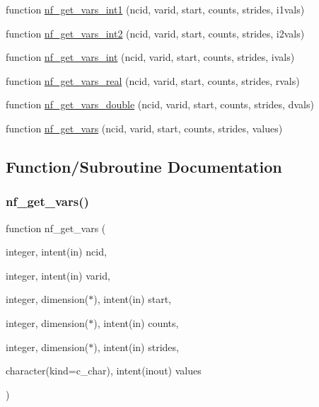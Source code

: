 \begin{DoxyCompactItemize}
\item 
function \hyperlink{nf__varsio_8F90_a96025ecd11790006d4fed45a975b2a1d}{nf\+\_\+get\+\_\+vars\+\_\+int1} (ncid, varid, start, counts, strides, i1vals)
\item 
function \hyperlink{nf__varsio_8F90_a92ab3fdc5dc6cba3ae8e4a3b79c6396f}{nf\+\_\+get\+\_\+vars\+\_\+int2} (ncid, varid, start, counts, strides, i2vals)
\item 
function \hyperlink{nf__varsio_8F90_a1eb11535e4e9a1f71739815c851b0957}{nf\+\_\+get\+\_\+vars\+\_\+int} (ncid, varid, start, counts, strides, ivals)
\item 
function \hyperlink{nf__varsio_8F90_ada6429f71e07e9d429b32f458dbfebf1}{nf\+\_\+get\+\_\+vars\+\_\+real} (ncid, varid, start, counts, strides, rvals)
\item 
function \hyperlink{nf__varsio_8F90_a348edafd5b086a88462c1965a0a33892}{nf\+\_\+get\+\_\+vars\+\_\+double} (ncid, varid, start, counts, strides, dvals)
\item 
function \hyperlink{nf__varsio_8F90_aebe0d366f2780bd6c5fbfc09663de147}{nf\+\_\+get\+\_\+vars} (ncid, varid, start, counts, strides, values)
\end{DoxyCompactItemize}


\subsection{Function/\+Subroutine Documentation}
\mbox{\label{nf__varsio_8F90_aebe0d366f2780bd6c5fbfc09663de147}} 
\subsubsection{\texorpdfstring{nf\+\_\+get\+\_\+vars()}{nf\_get\_vars()}}
{\footnotesize\ttfamily function nf\+\_\+get\+\_\+vars (\begin{DoxyParamCaption}\item[{integer, intent(in)}]{ncid,  }\item[{integer, intent(in)}]{varid,  }\item[{integer, dimension($\ast$), intent(in)}]{start,  }\item[{integer, dimension($\ast$), intent(in)}]{counts,  }\item[{integer, dimension($\ast$), intent(in)}]{strides,  }\item[{character(kind=c\+\_\+char), intent(inout)}]{values }\end{DoxyParamCaption})}



